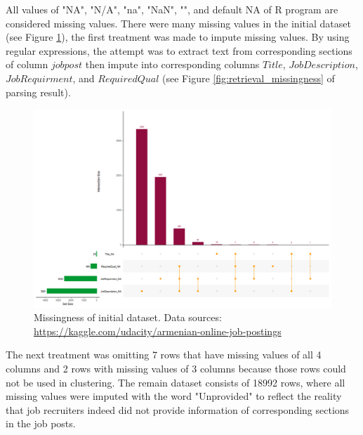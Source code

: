 \documentclass[a4paper,man,floatsintext,natbib,noextraspace]{apa6}
\begin{document}
All values of "NA", "N/A", "na", "NaN", "", and default NA of R program are considered missing values. There were many missing values in the initial dataset (see Figure \ref{fig:initial_missingness}), the first treatment was made to impute missing values. By using regular expressions, the attempt was to extract text from corresponding sections of column $jobpost$ then impute into corresponding columns $Title$, $JobDescription$, $JobRequirment$, and $RequiredQual$ (see Figure \ref{fig:retrieval_missingness} of parsing result). 

\begin{figure}
    \centering
    \includegraphics[width=\textwidth]{initial_missingness.png}
    \caption{Missingness of initial dataset. Data sources: \url{https://kaggle.com/udacity/armenian-online-job-postings}}
    \label{fig:initial_missingness}
\end{figure}

The next treatment was omitting 7 rows that have missing values of all 4 columns and 2 rows with  missing values of 3 columns because those rows could not be used in clustering. The remain dataset consists of 18992 rows, where all missing values were imputed with the word "Unprovided" to reflect the reality that job recruiters indeed did not provide information of corresponding sections in the job posts.
\end{document}
